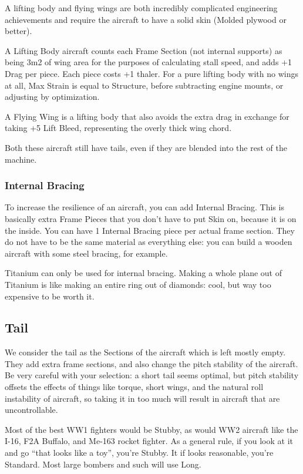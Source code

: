 \documentclass{article}
\begin{document}
A lifting body and flying wings are both incredibly complicated
engineering achievements and require the aircraft to have a solid skin
(Molded plywood or better).

A Lifting Body aircraft counts each Frame Section (not internal
supports) as being 3m2 of wing area for the purposes of calculating
stall speed, and adds +1 Drag per piece. Each piece costs +1 thaler. For
a pure lifting body with no wings at all, Max Strain is equal to
Structure, before subtracting engine mounts, or adjusting by
optimization.

A Flying Wing is a lifting body that also avoids the extra drag
in exchange for taking +5 Lift Bleed, representing the overly thick wing
chord.

Both these aircraft still have tails, even if they are blended
into the rest of the machine.

\subsubsection{Internal Bracing}
\label{_Internal Bracing}

To increase the resilience of an aircraft, you can add Internal Bracing.
This is basically extra Frame Pieces that you don't have to put Skin on,
because it is on the inside. You can have 1 Internal Bracing piece per
actual frame section. They do not have to be the same material as
everything else: you can build a wooden aircraft with some steel
bracing, for example.

Titanium can only be used for internal bracing. Making a whole plane out
of Titanium is like making an entire ring out of diamonds: cool, but way
too expensive to be worth it.

\subsection{Tail}
\label{_Tail}

We consider the tail as the Sections of the aircraft which is left
mostly empty. They add extra frame sections, and also change the pitch
stability of the aircraft. Be very careful with your selection: a short
tail seems optimal, but pitch stability offsets the effects of things
like torque, short wings, and the natural roll instability of aircraft,
so taking it in too much will result in aircraft that are
uncontrollable.

Most of the best WW1 fighters would be Stubby, as would WW2 aircraft
like the I-16, F2A Buffalo, and Me-163 rocket fighter. As a general
rule, if you look at it and go ``that looks like a toy'', you're Stubby.
It if looks reasonable, you're Standard. Most large bombers and such
will use Long.
\end{document}
